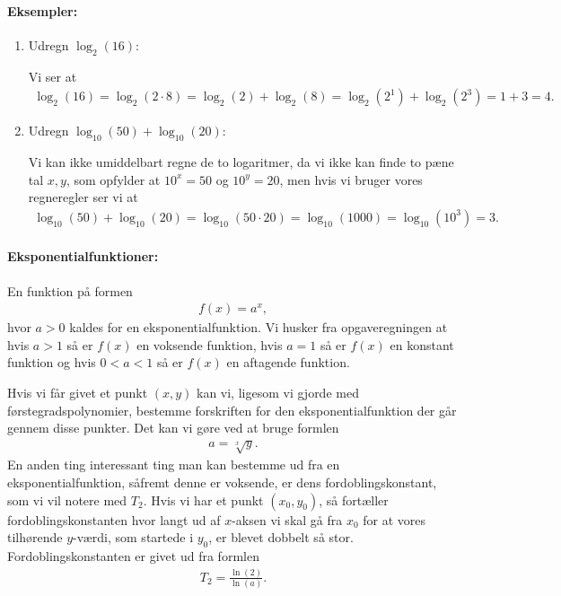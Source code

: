 \paragraph*{Eksempler:}
\begin{enumerate}
\item Udregn $\log_2(16)$:

Vi ser at 
\begin{align*}
\log_2(16)=\log_2(2 \cdot 8) = \log_2(2)+\log_2(8) = \log_2(2^1)+ \log_2(2^3) = 1+3 = 4.
\end{align*}
\item Udregn $\log_{10}(50)+\log_{10}(20)$:

Vi kan ikke umiddelbart regne de to logaritmer, da vi ikke kan finde to pæne tal $x,y$, som opfylder at $10^x=50$ og $10^y=20$, men hvis vi bruger vores regneregler ser vi at
\begin{align*}
\log_{10}(50)+\log_{10}(20)=\log_{10}(50 \cdot 20) = \log_{10}(1000)=\log_{10}(10^3)=3.
\end{align*}
\end{enumerate}
\paragraph*{Eksponentialfunktioner:}
En funktion på formen 
\begin{align*}
f(x) = a^x,
\end{align*}
hvor $a >0$ kaldes for en eksponentialfunktion. Vi husker fra opgaveregningen at hvis $a > 1$ så er $f(x)$ en voksende funktion, hvis $a=1$ så er $f(x)$ en konstant funktion og hvis $0<a<1$ så er $f(x)$ en aftagende funktion.

Hvis vi får givet et punkt $(x,y)$ kan vi, ligesom vi gjorde med førstegradspolynomier,  bestemme forskriften for den eksponentialfunktion der går gennem disse punkter. Det kan vi gøre ved at bruge formlen
\begin{align*}
a=\sqrt[x]{y}.
\end{align*}
En anden ting interessant ting man kan bestemme ud fra en eksponentialfunktion, såfremt denne er voksende, er dens fordoblingskonstant, som vi vil notere med $T_2$. Hvis vi har et punkt $(x_0,y_0)$, så fortæller fordoblingskonstanten hvor langt ud af $x$-aksen vi skal gå fra $x_0$ for at vores tilhørende $y$-værdi, som startede i $y_0$, er blevet dobbelt så stor. Fordoblingskonstanten er givet ud fra formlen
\begin{align*}
T_2=\frac{\ln(2)}{\ln(a)}.
\end{align*}


